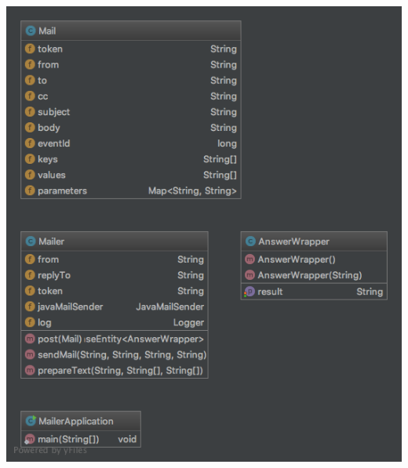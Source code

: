 \documentclass[11pt]{article} %
\begin{document}
\includegraphics[width=1.0\textwidth]{class-diagrams/Mailer-00}
\\
\\
\end{document}

